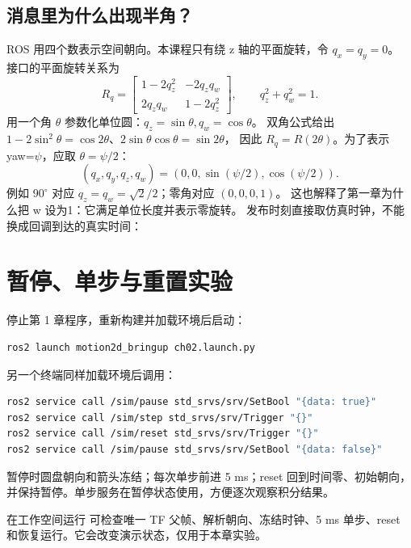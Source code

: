 \subsection*{消息里为什么出现半角？}
ROS 用四个数表示空间朝向。本课程只有绕 z 轴的平面旋转，令 $q_x=q_y=0$。
接口的平面旋转关系为
\begin{equation}
R_q=\begin{bmatrix}1-2q_z^2&-2q_zq_w\\2q_zq_w&1-2q_z^2\end{bmatrix},
\qquad q_z^2+q_w^2=1.
\end{equation}
用一个角 $\theta$ 参数化单位圆：$q_z=\sin\theta,q_w=\cos\theta$。
双角公式给出 $1-2\sin^2\theta=\cos2\theta$、$2\sin\theta\cos\theta=\sin2\theta$，
因此 $R_q=R(2\theta)$。为了表示 yaw=$\psi$，应取 $\theta=\psi/2$：
\begin{equation}
(q_x,q_y,q_z,q_w)=(0,0,\sin(\psi/2),\cos(\psi/2)).
\end{equation}
例如 $90^\circ$ 对应 $q_z=q_w=\sqrt2/2$；零角对应 $(0,0,0,1)$。
这也解释了第一章为什么把 w 设为1：它满足单位长度并表示零旋转。
发布时刻直接取仿真时钟，不能换成回调到达的真实时间：
\par\noindent\begin{minipage}{\linewidth}

\end{minipage}\par

\section{暂停、单步与重置实验}
停止第 1 章程序，重新构建并加载环境后启动：
\begin{lstlisting}[language=bash,numbers=none]
ros2 launch motion2d_bringup ch02.launch.py
\end{lstlisting}
另一个终端同样加载环境后调用：
\begin{lstlisting}[language=bash,numbers=none]
ros2 service call /sim/pause std_srvs/srv/SetBool "{data: true}"
ros2 service call /sim/step std_srvs/srv/Trigger "{}"
ros2 service call /sim/reset std_srvs/srv/Trigger "{}"
ros2 service call /sim/pause std_srvs/srv/SetBool "{data: false}"
\end{lstlisting}
暂停时圆盘朝向和箭头冻结；每次单步前进 5 ms；reset 回到时间零、初始朝向，并保持暂停。单步服务在暂停状态使用，方便逐次观察积分结果。

在工作空间运行  可检查唯一 TF 父帧、解析朝向、冻结时钟、5 ms 单步、reset 和恢复运行。它会改变演示状态，仅用于本章实验。

